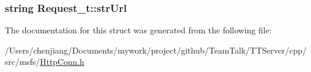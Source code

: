 \subsubsection[{str\+Url}]{\setlength{\rightskip}{0pt plus 5cm}string Request\+\_\+t\+::str\+Url}\label{struct_request__t_a92c6a0355cab06130f4cf1a497a6992b}


The documentation for this struct was generated from the following file\+:\begin{DoxyCompactItemize}
\item 
/\+Users/chenjiang/\+Documents/mywork/project/github/\+Team\+Talk/\+T\+T\+Server/cpp/src/msfs/\hyperlink{msfs_2_http_conn_8h}{Http\+Conn.\+h}\end{DoxyCompactItemize}
